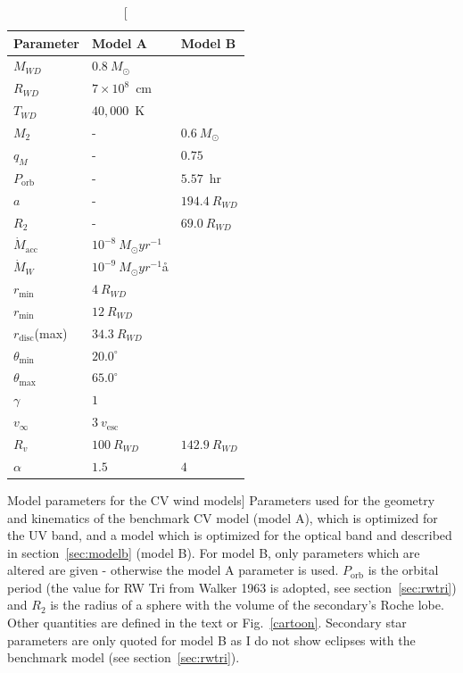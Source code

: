 %
%


\begin{table}
\centering
\begin{tabular}{p{2cm}p{2cm}p{2cm}}
\hline Parameter 	&	 Model A  & Model B \\ 
\hline \hline 
$M_{WD}$ 	 &	 $0.8~M_{\odot}$  &     \\ 
$R_{WD}$ 	 &	 $7\times10^{8}$~cm  & \\ 
$T_{WD}$ 	 &	 $40,000$~K        &  \\
$M_{2}$ 	& -&	 $0.6~M_{\odot}$   \\ 
$q_M$ 	&- &	 $0.75$   \\ 
$P_{\mathrm{orb}}$ 	&- &	 $5.57$~hr   \\ 
$a$ 	& -&	 $194.4~R_{WD}$   \\ 
$R_2$   &   -  &	 $69.0~R_{WD}$  \\ 
$\dot{M}_{\mathrm{acc}}$ 	 &	 $10^{-8}~M_{\odot}yr^{-1}$  &\\ 
$\dot{M}_W$  &	$10^{-9}~M_{\odot}yr^{-1}$å  & \\ 
$r_{\mathrm{min}}$ 	&	 $4~R_{WD}$ &  \\ 
$r_{\mathrm{min}}$ 	&	 $12~R_{WD}$  &  \\ 
$r_{\mathrm{disc}}$(max) 	&	 $34.3~R_{WD}$  &  \\ 
$\theta_{\mathrm{min}}$	&	 $20.0^{\circ}$  &  \\ 
$\theta_{\mathrm{max}}$ 	&	 $65.0^{\circ}$  &  \\ 
$\gamma$ 	&	 $1$  &  \\ 
$v_{\infty}$ 	&	 $3~v_{\mathrm{esc}}$  &  \\ 
$R_v$ 	        &	 $100~R_{WD}$  &  $142.9~R_{WD}$  \\ 
$\alpha$ 	&	 $1.5$   &   $4$\\
\hline 
\end{tabular} 
\centering
\caption
[Model parameters for the CV wind models]
{
Parameters used for the geometry and kinematics of the benchmark 
CV model (model A), which is optimized for the UV band, and a model
which is optimized for the optical band and described in section~\ref{sec:modelb} (model B).
For model B, only parameters which are altered are given - otherwise the
model A parameter is used. $P_{\mathrm{orb}}$ is the orbital period 
(the value for RW Tri from Walker 1963 is adopted, see section~\ref{sec:rwtri}) and 
$R_2$ is the radius of a sphere with the volume of the secondary's Roche lobe. 
Other quantities are defined in the text or Fig.~\ref{cartoon}.
Secondary star parameters are only quoted for 
model B as I do not show eclipses with the 
benchmark model (see section~\ref{sec:rwtri}).
}
\label{wind_param}
\label{modelb_table}
\end{table}

